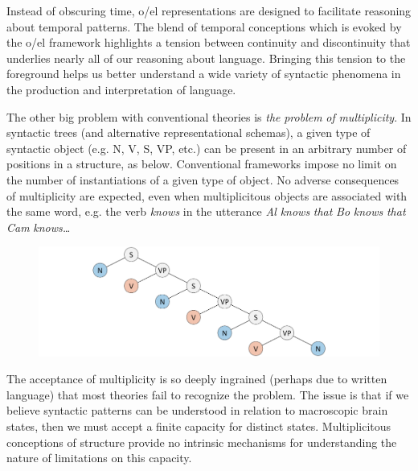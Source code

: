   Instead of obscuring time, o/el representations are designed to facilitate reasoning about temporal patterns. The blend of temporal conceptions which is evoked by the o/el framework highlights a tension between continuity and discontinuity that underlies nearly all of our reasoning about language. Bringing this tension to the foreground helps us better understand a wide variety of syntactic phenomena in the production and interpretation of language.

The other big problem with conventional theories is \textit{the} \textit{problem} \textit{of} \textit{multiplicity}. In syntactic trees (and alternative representational schemas), a given type of syntactic object (e.g. N, V, S, VP, etc.) can be present in an arbitrary number of positions in a structure, as below. Conventional frameworks impose no limit on the number of instantiations of a given type of object. No adverse consequences of multiplicity are expected, even when multiplicitous objects are associated with the same word, e.g. the verb \textit{knows} in the utterance \textit{Al} \textit{knows} \textit{that} \textit{Bo} \textit{knows} \textit{that} \textit{Cam} \textit{knows…}  

  
\begin{figure}
\includegraphics[width=\textwidth]{figures/Tilsen-img7.png}
\caption{\missingcaption}
\label{fig:}
\end{figure}
 

  The acceptance of multiplicity is so deeply ingrained (perhaps due to written language) that most theories fail to recognize the problem. The issue is that if we believe syntactic patterns can be understood in relation to macroscopic brain states, then we must accept a finite capacity for distinct states. Multiplicitous conceptions of structure provide no intrinsic mechanisms for understanding the nature of limitations on this capacity.

